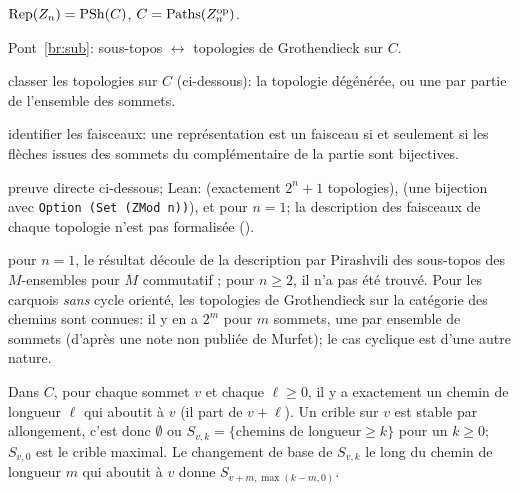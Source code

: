 \begin{trace}
\item[tablier] $\mathrm{Rep}(Z_n) = \mathrm{PSh}(C)$, $C = \mathrm{Paths}(Z_n^{\mathrm{op}})$.
\item[arche] Pont~\ref{br:sub}: sous-topos $\leftrightarrow$ topologies de Grothendieck sur $C$.
\item[spécialiser] classer les topologies sur $C$ (ci-dessous): la topologie dégénérée, ou une par partie de l'ensemble des sommets.
\item[déplier] identifier les faisceaux: une représentation est un faisceau si et seulement si les flèches issues des sommets du complémentaire de la partie sont bijectives.
\item[vérifier] preuve directe ci-dessous; Lean:  (exactement $2^n+1$ topologies),  (une bijection avec \texttt{Option (Set (ZMod n))}),  et  pour $n = 1$; la description des faisceaux de chaque topologie n'est pas formalisée ().
\item[nouveauté] pour $n = 1$, le résultat découle de la description par Pirashvili des sous-topos des $M$-ensembles pour $M$ commutatif \cite[Cor.~4.3.11]{pirashvili-jpaa}; pour $n\ge 2$, il n'a pas été trouvé. Pour les carquois \emph{sans} cycle orienté, les topologies de Grothendieck sur la catégorie des chemins sont connues: il y en a $2^m$ pour $m$ sommets, une par ensemble de sommets \cite[Cor.~4.3]{schmid} (d'après une note non publiée de Murfet); le cas cyclique est d'une autre nature.
\end{trace}

\direct{} Dans $C$, pour chaque sommet $v$ et chaque $\ell\ge 0$, il y a exactement un chemin de longueur $\ell$ qui aboutit à $v$ (il part de $v+\ell$). Un crible sur $v$ est stable par allongement, c'est donc $\emptyset$ ou $S_{v,k} = \{\text{chemins de longueur}\ge k\}$ pour un $k\ge 0$; $S_{v,0}$ est le crible maximal. Le changement de base de $S_{v,k}$ le long du chemin de longueur $m$ qui aboutit à $v$ donne $S_{v+m,\max(k-m,0)}$.

